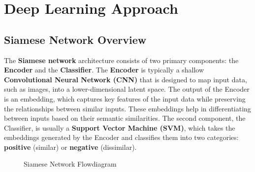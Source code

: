 \section{Deep Learning Approach}
\subsection{Siamese Network Overview}

The \textbf{Siamese network} architecture consists of two primary components: the \textbf{Encoder} and the \textbf{Classifier}. The \textbf{Encoder} is typically a shallow \textbf{Convolutional Neural Network (CNN)} that is designed to map input data, such as images, into a lower-dimensional latent space. The output of the Encoder is an embedding, which captures key features of the input data while preserving the relationships between similar inputs. These embeddings help in differentiating between inputs based on their semantic similarities. The second component, the Classifier, is usually a \textbf{Support Vector Machine (SVM)}, which takes the embeddings generated by the Encoder and classifies them into two categories: \textbf{positive} (similar) or \textbf{negative} (dissimilar).

\begin{figure}[htbp]
\centering
{}
\caption{Siamese Network Flowdiagram}
\end{figure}
